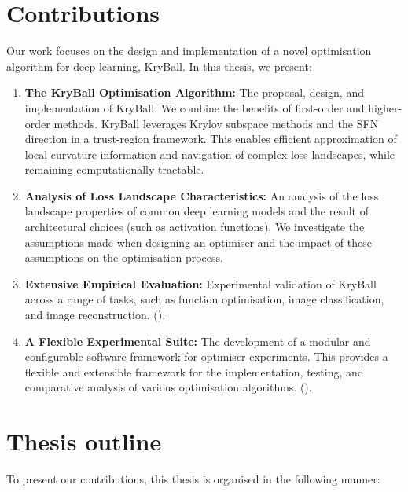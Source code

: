 \section{Contributions}
\label{sec:contributions}

Our work focuses on the design and implementation of a novel optimisation algorithm for deep learning, KryBall. In this thesis, we present:
\begin{enumerate}
    \item \textbf{The KryBall Optimisation Algorithm:} The proposal, design, and implementation of KryBall. We combine the benefits of first-order and higher-order methods. KryBall leverages Krylov subspace methods and the SFN direction in a trust-region framework. This enables efficient approximation of local curvature information and navigation of complex loss landscapes, while remaining computationally tractable.
    \item \textbf{Analysis of Loss Landscape Characteristics:} An analysis of the loss landscape properties of common deep learning models and the result of architectural choices (such as activation functions). We investigate the assumptions made when designing an optimiser and the impact of these assumptions on the optimisation process.
    \item \textbf{Extensive Empirical Evaluation:} Experimental validation of KryBall across a range of tasks, such as function optimisation, image classification, and image reconstruction. 
    (\color{red}{can also add the interpretability work here if needs to be more diverse.}\color{black}).
    \item \textbf{A Flexible Experimental Suite:} The development of a modular and configurable software framework for optimiser experiments. This provides a flexible and extensible framework for the implementation, testing, and comparative analysis of various optimisation algorithms. 
    (\color{red}{while not research --- I do think the current framework is a good software suite for a range of tasks that I haven't seen anywhere for optimiser research. It's quite efficient and extensible. Happy to remove if it doesn't really count as a contribution.}\color{black}).
\end{enumerate}

\section{Thesis outline}
\label{sec:thesis_outline}

To present our contributions, this thesis is organised in the following manner:

